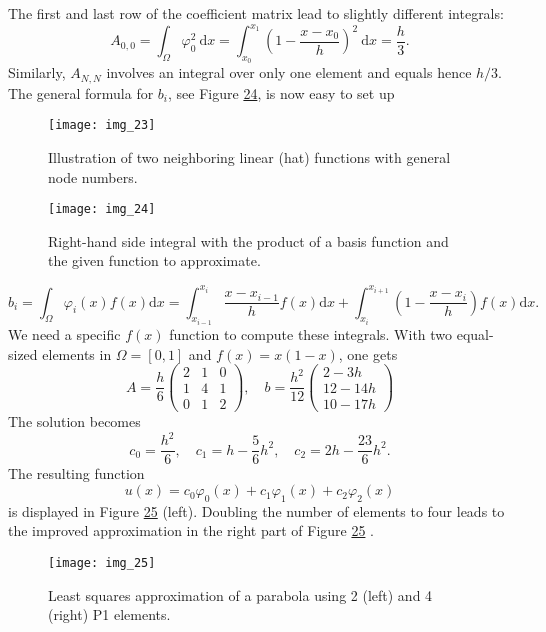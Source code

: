 \documentclass[../main.tex]{subfiles}
\begin{document}
	The first and last row of the coefficient matrix lead to slightly different integrals:
	$$
	A_{0,0}=\int_{\Omega} \varphi_{0}^{2} \mathrm{~d} x=\int_{x_{0}}^{x_{1}}\left(1-\frac{x-x_{0}}{h}\right)^{2} \mathrm{~d} x=\frac{h}{3}.
	$$
	Similarly, $A_{N, N}$ involves an integral over only one element and equals hence $h / 3$. The general formula for $b_{i}$, see Figure \hyperref[fig:img_24]{24}, is now easy to set up
	\begin{figure}[H]
		\centering
		\texttt{[image: img\_23]}
		\caption{Illustration of two neighboring linear (hat) functions with general
			node numbers.}
		\label{fig:img_23}
	\end{figure}
	\begin{figure}[H]
		\centering
		\texttt{[image: img\_24]}
		\caption{Right-hand side integral with the product of a basis function and
			the given function to approximate.}
		\label{fig:img_24}
	\end{figure}
	\begin{equation}\label{eqa56}
		b_{i}=\int_{\Omega} \varphi_{i}(x) f(x) \mathrm{d} x=\int_{x_{i-1}}^{x_{i}} \frac{x-x_{i-1}}{h} f(x) \mathrm{d} x+\int_{x_{i}}^{x_{i+1}}\left(1-\frac{x-x_{i}}{h}\right) f(x) \mathrm{d} x.
	\end{equation}
	We need a specific $f(x)$ function to compute these integrals. With two equal-sized elements in $\Omega=[0,1]$ and $f(x)=x(1-x)$, one gets
	$$
	A=\frac{h}{6}\left(\begin{array}{ccc}
		2 & 1 & 0 \\
		1 & 4 & 1 \\
		0 & 1 & 2
	\end{array}\right), \quad b=\frac{h^{2}}{12}\left(\begin{array}{c}
		2-3 h \\
		12-14 h \\
		10-17 h
	\end{array}\right)
	$$
	The solution becomes
	$$
	c_{0}=\frac{h^{2}}{6}, \quad c_{1}=h-\frac{5}{6} h^{2}, \quad c_{2}=2 h-\frac{23}{6} h^{2}.
	$$
	The resulting function
	$$
	u(x)=c_{0} \varphi_{0}(x)+c_{1} \varphi_{1}(x)+c_{2} \varphi_{2}(x)
	$$
	is displayed in Figure \hyperref[fig:img_25]{25} (left). Doubling the number of elements to four leads to the improved approximation in the right part of Figure \hyperref[fig:img_25]{25} .
	\begin{figure}[H]
		\centering
		\texttt{[image: img\_25]}
		\caption{Least squares approximation of a parabola using 2 (left) and 4
			(right) P1 elements.}
		\label{fig:img_25}
	\end{figure}
	
\end{document}
